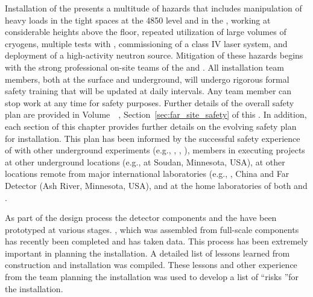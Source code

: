 



Installation of the  presents a multitude of hazards that includes  manipulation of heavy loads in the tight spaces at the 4850 level and in the ,  working at considerable heights above the floor, repeated utilization of large volumes of cryogens, multiple tests with , commissioning of a class IV laser system, and deployment of a high-activity neutron source. Mitigation of these hazards begins with the strong professional on-site  teams of the  and .
All installation team members, both at the surface and underground, will undergo rigorous formal safety training that will be updated at daily intervals. Any team member can stop work at any time for safety purposes. Further details of the overall  safety plan are provided in   
 Volume~\volnumbertc~\voltitletc, Section~\ref{sec:far_site_safety} of this .  In addition, each section of this chapter provides further details on the evolving safety plan for installation. This plan has been informed by the successful safety experience of  with other underground experiments (e.g., , , ),  members in executing projects at other underground locations (e.g.,  at Soudan, Minnesota, USA), at other locations remote from major international laboratories (e.g., , China and  Far Detector (Ash River, Minnesota, USA), and at the home laboratories of both  and .




As part of the  design process the detector components and the  have been prototyped at various stages. , which was assembled from full-scale %
components has recently been completed and has taken data. 
This process has been extremely important in planning the  %
installation. A detailed list of lessons learned from  construction and installation was compiled\cite{bib:docdb8255}. 
These lessons %
and other experience from the team planning the installation was used to develop a list of \textquotedblleft risks \textquotedblright for the %
 installation. 


